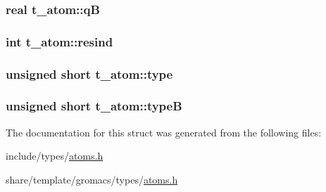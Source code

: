 \hypertarget{structt__atom_a932d3f97cca81039934fe8ebe0f314eb}{
\subsubsection[{q\-B}]{\setlength{\rightskip}{0pt plus 5cm}real {\bf t\-\_\-atom\-::q\-B}}}\label{structt__atom_a932d3f97cca81039934fe8ebe0f314eb}
\hypertarget{structt__atom_acc3bf5622db75ca3187afda78c107f92}{
\subsubsection[{resind}]{\setlength{\rightskip}{0pt plus 5cm}int {\bf t\-\_\-atom\-::resind}}}\label{structt__atom_acc3bf5622db75ca3187afda78c107f92}
\hypertarget{structt__atom_ac44742a0ac2c22eb3a9a3a8835257613}{
\subsubsection[{type}]{\setlength{\rightskip}{0pt plus 5cm}unsigned short {\bf t\-\_\-atom\-::type}}}\label{structt__atom_ac44742a0ac2c22eb3a9a3a8835257613}
\hypertarget{structt__atom_aa599512dd98710740379badce45bebac}{
\subsubsection[{type\-B}]{\setlength{\rightskip}{0pt plus 5cm}unsigned short {\bf t\-\_\-atom\-::type\-B}}}\label{structt__atom_aa599512dd98710740379badce45bebac}


\-The documentation for this struct was generated from the following files\-:\begin{DoxyCompactItemize}
\item 
include/types/\hyperlink{include_2types_2atoms_8h}{atoms.\-h}\item 
share/template/gromacs/types/\hyperlink{share_2template_2gromacs_2types_2atoms_8h}{atoms.\-h}\end{DoxyCompactItemize}
